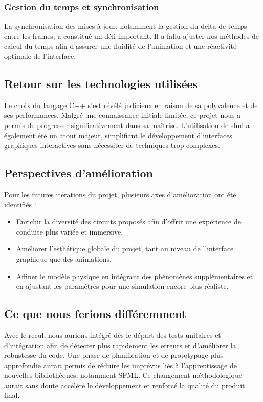 \subsubsection{Gestion du temps et synchronisation}\label{subsubsec:la-gestion-du-temps}
La synchronisation des mises à jour, notamment la gestion du delta de temps entre les frames, a constitué un défi important.
Il a fallu ajuster nos méthodes de calcul du temps afin d’assurer une fluidité de l’animation et une réactivité optimale de l’interface.

\subsection{Retour sur les technologies utilisées}\label{subsec:retour-sur-les-technologies-utilisees}
Le choix du langage C++ s'est révélé judicieux en raison de sa polyvalence et de ses performances.
Malgré une connaissance initiale limitée, ce projet nous a permis de progresser significativement dans sa maîtrise.
L'utilisation de \gls{sfml} a également été un atout majeur, simplifiant le développement d'interfaces graphiques interactives sans nécessiter de techniques trop complexes.

\subsection{Perspectives d'amélioration}\label{subsec:perspectives-d'ameliorations}
Pour les futures itérations du projet, plusieurs axes d'amélioration ont été identifiés :
\begin{itemize}
    \item Enrichir la diversité des circuits proposés afin d'offrir une expérience de conduite plus variée et immersive.
    \item Améliorer l'esthétique globale du projet, tant au niveau de l'interface graphique que des animations.
    \item Affiner le modèle physique en intégrant des phénomènes supplémentaires et en ajustant les paramètres pour une simulation encore plus réaliste.
\end{itemize}

\subsection{Ce que nous ferions différemment}\label{subsec:ce-que-nous-ferions-differemment}
Avec le recul, nous aurions intégré dès le départ des tests unitaires et d'intégration afin de détecter plus rapidement les erreurs et d'améliorer la robustesse du code.
Une phase de planification et de prototypage plus approfondie aurait permis de réduire les imprévus liés à l'apprentissage de nouvelles bibliothèques, notamment SFML\@.
Ce changement méthodologique aurait sans doute accéléré le développement et renforcé la qualité du produit final.

